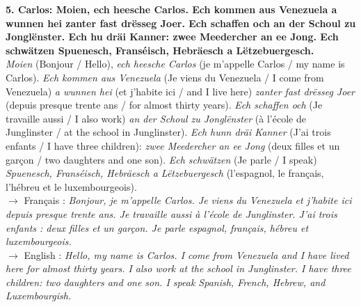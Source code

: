 \noindent\textbf{5. Carlos: Moien, ech heesche Carlos. Ech kommen aus Venezuela a wunnen hei zanter fast drësseg Joer. Ech schaffen och an der Schoul zu Jonglënster. Ech hu dräi Kanner: zwee Meedercher an ee Jong. Ech schwätzen Spuenesch, Franséisch, Hebräesch a Lëtzebuergesch.}\\
\textit{Moien} (Bonjour / Hello), \textit{ech heesche Carlos} (je m'appelle Carlos / my name is Carlos). \textit{Ech kommen aus Venezuela} (Je viens du Venezuela / I come from Venezuela) \textit{a wunnen hei} (et j'habite ici / and I live here) \textit{zanter fast drësseg Joer} (depuis presque trente ans / for almost thirty years). \textit{Ech schaffen och} (Je travaille aussi / I also work) \textit{an der Schoul zu Jonglënster} (à l'école de Junglinster / at the school in Junglinster). \textit{Ech hunn dräi Kanner} (J'ai trois enfants / I have three children): \textit{zwee Meedercher an ee Jong} (deux filles et un garçon / two daughters and one son). \textit{Ech schwätzen} (Je parle / I speak) \textit{Spuenesch, Franséisch, Hebräesch a Lëtzebuergesch} (l'espagnol, le français, l'hébreu et le luxembourgeois).\\
$\rightarrow$ Français : \textit{Bonjour, je m'appelle Carlos. Je viens du Venezuela et j'habite ici depuis presque trente ans. Je travaille aussi à l'école de Junglinster. J'ai trois enfants : deux filles et un garçon. Je parle espagnol, français, hébreu et luxembourgeois.}\\
$\rightarrow$ English : \textit{Hello, my name is Carlos. I come from Venezuela and I have lived here for almost thirty years. I also work at the school in Junglinster. I have three children: two daughters and one son. I speak Spanish, French, Hebrew, and Luxembourgish.}\\[0.5em]

